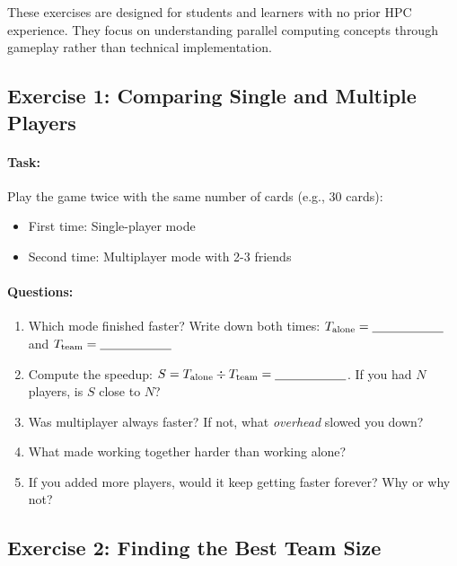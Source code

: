 These exercises are designed for students and learners with no prior HPC experience. They focus on understanding parallel computing concepts through gameplay rather than technical implementation.

\subsection{Exercise 1: Comparing Single and Multiple Players}

\paragraph{Task:}

Play the game twice with the same number of cards (e.g., 30 cards):
\begin{itemize}
    \item First time: Single-player mode
    \item Second time: Multiplayer mode with 2-3 friends
\end{itemize}

\paragraph{Questions:}
\begin{enumerate}
    \item Which mode finished faster? Write down both times: $T_{\text{alone}} = \text{\underline{\hspace{2cm}}}$ and $T_{\text{team}} = \text{\underline{\hspace{2cm}}}$
    \item Compute the speedup: $S = T_{\text{alone}} \div T_{\text{team}} = \text{\underline{\hspace{2cm}}}$. If you had $N$ players, is $S$ close to $N$?
    \item Was multiplayer always faster? If not, what \emph{overhead} slowed you down?
    \item What made working together harder than working alone?
    \item If you added more players, would it keep getting faster forever? Why or why not?
\end{enumerate}

\subsection{Exercise 2: Finding the Best Team Size}

